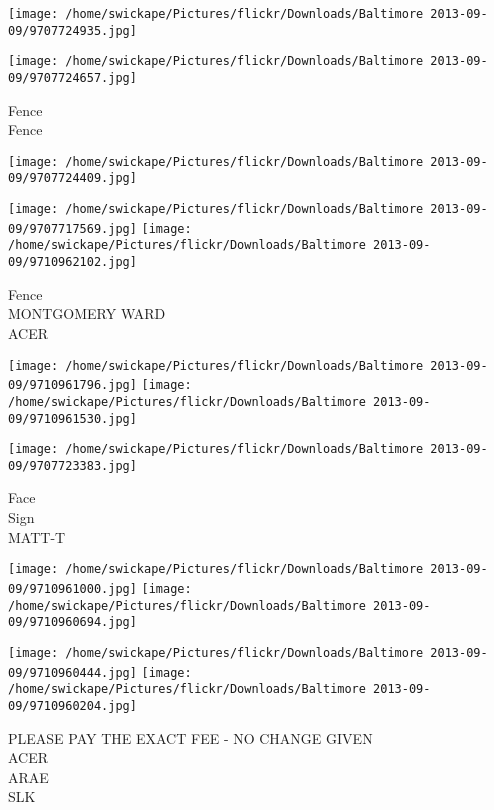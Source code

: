 \documentclass[10pt,letterpaper]{article}
\begin{document}
\texttt{[image: /home/swickape/Pictures/flickr/Downloads/Baltimore 2013-09-09/9707724935.jpg]}

\vspace{0.25in}
\texttt{[image: /home/swickape/Pictures/flickr/Downloads/Baltimore 2013-09-09/9707724657.jpg]}

Fence\\
Fence\\
\pagebreak

\texttt{[image: /home/swickape/Pictures/flickr/Downloads/Baltimore 2013-09-09/9707724409.jpg]}

\vspace{0.25in}
\texttt{[image: /home/swickape/Pictures/flickr/Downloads/Baltimore 2013-09-09/9707717569.jpg]}
\texttt{[image: /home/swickape/Pictures/flickr/Downloads/Baltimore 2013-09-09/9710962102.jpg]}

Fence\\
MONTGOMERY WARD\\
ACER\\
\pagebreak

\texttt{[image: /home/swickape/Pictures/flickr/Downloads/Baltimore 2013-09-09/9710961796.jpg]}
\texttt{[image: /home/swickape/Pictures/flickr/Downloads/Baltimore 2013-09-09/9710961530.jpg]}

\vspace{0.25in}
\texttt{[image: /home/swickape/Pictures/flickr/Downloads/Baltimore 2013-09-09/9707723383.jpg]}

Face\\
Sign\\
MATT{-}T\\
\pagebreak

\texttt{[image: /home/swickape/Pictures/flickr/Downloads/Baltimore 2013-09-09/9710961000.jpg]}
\texttt{[image: /home/swickape/Pictures/flickr/Downloads/Baltimore 2013-09-09/9710960694.jpg]}

\texttt{[image: /home/swickape/Pictures/flickr/Downloads/Baltimore 2013-09-09/9710960444.jpg]}
\texttt{[image: /home/swickape/Pictures/flickr/Downloads/Baltimore 2013-09-09/9710960204.jpg]}

PLEASE PAY THE EXACT FEE {-} NO CHANGE GIVEN\\
ACER\\
ARAE\\
SLK\\
\pagebreak
\end{document}
